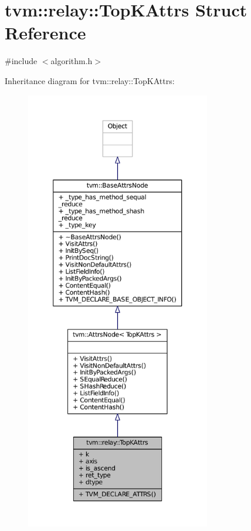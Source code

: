 \hypertarget{structtvm_1_1relay_1_1TopKAttrs}{}\section{tvm\+:\+:relay\+:\+:Top\+K\+Attrs Struct Reference}
\label{structtvm_1_1relay_1_1TopKAttrs}


{\ttfamily \#include $<$algorithm.\+h$>$}



Inheritance diagram for tvm\+:\+:relay\+:\+:Top\+K\+Attrs\+:
\nopagebreak
\begin{figure}[H]
\begin{center}
\leavevmode
\includegraphics[height=550pt]{structtvm_1_1relay_1_1TopKAttrs__inherit__graph}
\end{center}
\end{figure}



